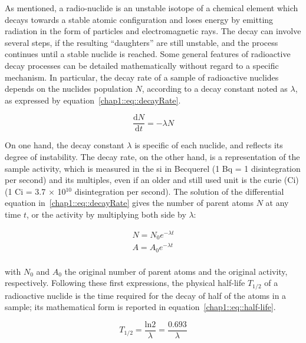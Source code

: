 As mentioned, a radio-nuclide is an unstable isotope of a chemical element which decays towards a stable atomic configuration and loses energy by emitting radiation in the form of particles and electromagnetic rays. The decay can involve several steps, if the resulting \enquote{daughters} are still unstable, and the process continues until a stable nuclide is reached. 
Some general features of radioactive decay processes can be detailed mathematically without regard to a specific mechanism. In particular, the decay rate of a sample of radioactive nuclides depends on the nuclides population $N$, according to a decay constant noted as $\lambda$, as expressed by equation~\ref{chap1::eq::decayRate}. 

\begin{equation}\label{chap1::eq::decayRate}
\frac{\mathrm{d}N}{\mathrm{d}t} = -\lambda N 
\end{equation} 

On one hand, the decay constant $\lambda$ is specific of each nuclide, and reflects its degree of instability. The decay rate, on the other hand, is a representation of the sample activity, which is measured in the \gls{si} in Becquerel (1 Bq = 1 disintegration per second) and its multiples, even if an older and still used unit is the curie (Ci) (1 Ci = 3.7 $\times$ 10$^{10}$ disintegration per second). The solution of the differential equation in~\ref{chap1::eq::decayRate} gives the number of parent atoms $N$ at any time $t$, or the activity by multiplying both side by $\lambda$:

\begin{equation}\label{chap1::eq::parentAtoms}
\begin{split}
N = N_{0}e^{-\lambda t}  \\
A = A_{0}e^{-\lambda t}  \\
\end{split}
\end{equation} 

with $N_0$ and $A_0$ the original number of parent atoms and the original activity, respectively. Following these first expressions, the physical half-life $T_{1/2}$ of a radioactive nuclide is the time required for the decay of half of the atoms in a sample; its mathematical form is reported in equation~\ref{chap1::eq::half-life}.

\begin{equation}\label{chap1::eq::half-life}
T_{1/2} = \frac{\mathrm{ln}2}{\lambda} = \frac{0.693}{\lambda}
\end{equation} 

